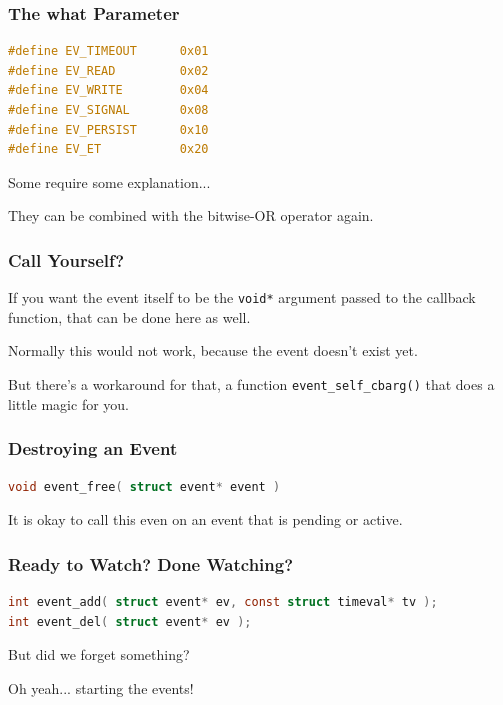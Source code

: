 \begin{frame}[fragile]
\frametitle{The what Parameter}

\begin{lstlisting}[language=C]
#define EV_TIMEOUT      0x01
#define EV_READ         0x02
#define EV_WRITE        0x04
#define EV_SIGNAL       0x08
#define EV_PERSIST      0x10
#define EV_ET           0x20
\end{lstlisting}

Some require some explanation...


They can be combined with the bitwise-OR operator again.

\end{frame}


\begin{frame}
\frametitle{Call Yourself?}

If you want the event itself to be the \texttt{void*} argument passed to the callback function, that can be done here as well. 

Normally this would not work, because the event doesn't exist yet. 

But there's a workaround for that, a function \texttt{event\_self\_cbarg()} that does a little magic for you.

\end{frame}


\begin{frame}[fragile]
\frametitle{Destroying an Event}
\begin{lstlisting}[language=C]
void event_free( struct event* event )
\end{lstlisting}

It is okay to call this even on an event that is pending or active.

\end{frame}


\begin{frame}[fragile]
\frametitle{Ready to Watch? Done Watching?}

\begin{lstlisting}[language=C]
int event_add( struct event* ev, const struct timeval* tv );
int event_del( struct event* ev );
\end{lstlisting}

But did we forget something?

Oh yeah... starting the events!

\end{frame}


